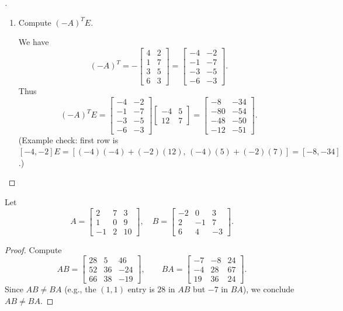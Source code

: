 \documentclass[en,hazy,blue,12pt,normal]{elegantnote}
\begin{document}
\begin{proof}[\solutionname]
\begin{enumerate}
\item[(e)] Compute $(-A)^T E$.

We have
\[
(-A)^T=
-\begin{bmatrix}
4 & 2\\
1 & 7\\
3 & 5\\
6 & 3
\end{bmatrix}
=
\begin{bmatrix}
-4 & -2\\
-1 & -7\\
-3 & -5\\
-6 & -3
\end{bmatrix}.
\]
Thus
\[
(-A)^T E
=
\begin{bmatrix}
-4 & -2\\
-1 & -7\\
-3 & -5\\
-6 & -3
\end{bmatrix}
\begin{bmatrix}
-4 & 5\\
12 & 7
\end{bmatrix}
=
\begin{bmatrix}
-8 & -34\\
-80 & -54\\
-48 & -50\\
-12 & -51
\end{bmatrix}.
\]
(Example check: first row is $[-4,-2]E = [(-4)(-4)+(-2)(12),\,(-4)(5)+(-2)(7)] = [-8,-34]$.)
\end{enumerate}

\end{proof}

\begin{homework}
    
Let
\[
A=
\begin{bmatrix}
2 & 7 & 3\\
1 & 0 & 9\\
-1 & 2 & 10
\end{bmatrix},
\quad
B=
\begin{bmatrix}
-2 & 0 & 3\\
2 & -1 & 7\\
6 & 4 & -3
\end{bmatrix}.
\]
\end{homework}

\begin{proof}
    Compute
\[
AB=
\begin{bmatrix}
28 & 5 & 46\\
52 & 36 & -24\\
66 & 38 & -19
\end{bmatrix},
\qquad
BA=
\begin{bmatrix}
-7 & -8 & 24\\
-4 & 28 & 67\\
19 & 36 & 24
\end{bmatrix}.
\]
Since $AB \neq BA$ (e.g., the $(1,1)$ entry is $28$ in $AB$ but $-7$ in $BA$), we conclude \textbf{$AB\neq BA$}.
\end{proof}
\end{document}

